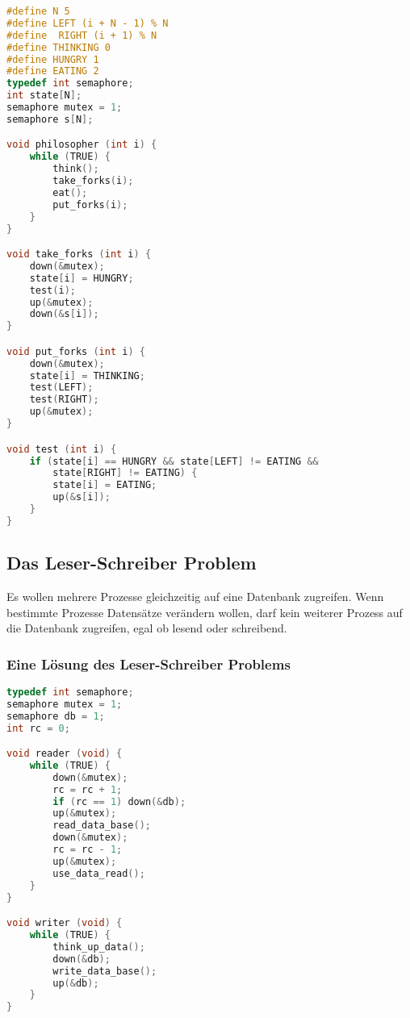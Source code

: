 \begin{lstlisting}[language=C]
#define N 5
#define LEFT (i + N - 1) % N
#define  RIGHT (i + 1) % N
#define THINKING 0
#define HUNGRY 1
#define EATING 2
typedef int semaphore;
int state[N];
semaphore mutex = 1;
semaphore s[N];

void philosopher (int i) {
    while (TRUE) {
        think();
        take_forks(i);
        eat();
        put_forks(i);
    }
} 

void take_forks (int i) {
    down(&mutex);
    state[i] = HUNGRY;
    test(i);
    up(&mutex);
    down(&s[i]);
} 

void put_forks (int i) {
    down(&mutex);
    state[i] = THINKING;
    test(LEFT);
    test(RIGHT);
    up(&mutex);
} 

void test (int i) {
    if (state[i] == HUNGRY && state[LEFT] != EATING &&
        state[RIGHT] != EATING) {
        state[i] = EATING;
        up(&s[i]);
    }
} 
\end{lstlisting}

\subsection{Das Leser-Schreiber Problem}

Es wollen mehrere Prozesse gleichzeitig auf eine Datenbank zugreifen. Wenn bestimmte Prozesse Datensätze verändern wollen, darf kein weiterer Prozess auf die Datenbank zugreifen, egal ob lesend oder schreibend.

\subsubsection{Eine Lösung des Leser-Schreiber Problems}

\begin{lstlisting}[language=C]
typedef int semaphore;
semaphore mutex = 1;
semaphore db = 1;
int rc = 0;

void reader (void) {
    while (TRUE) {
        down(&mutex);
        rc = rc + 1;
        if (rc == 1) down(&db);
        up(&mutex);
        read_data_base();
        down(&mutex);
        rc = rc - 1;
        up(&mutex);
        use_data_read();
    }
}

void writer (void) {
    while (TRUE) {
        think_up_data();
        down(&db);
        write_data_base();
        up(&db);
    }
}
\end{lstlisting}